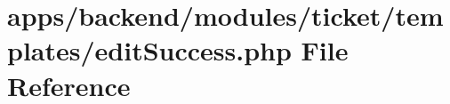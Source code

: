 \hypertarget{backend_2modules_2ticket_2templates_2edit_success_8php}{\section{apps/backend/modules/ticket/templates/edit\-Success.php File Reference}
\label{backend_2modules_2ticket_2templates_2edit_success_8php}
}
